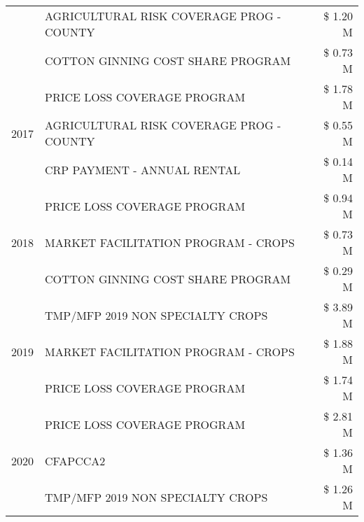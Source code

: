 \begin{tabular}{llr}
 & AGRICULTURAL RISK COVERAGE PROG - COUNTY & \$ 1.20 M \\
 & COTTON GINNING COST SHARE PROGRAM & \$ 0.73 M \\
\cline{1-3}
\multirow[t]{3}{*}{2017} & PRICE LOSS COVERAGE PROGRAM & \$ 1.78 M \\
 & AGRICULTURAL RISK COVERAGE PROG - COUNTY & \$ 0.55 M \\
 & CRP PAYMENT - ANNUAL RENTAL & \$ 0.14 M \\
\cline{1-3}
\multirow[t]{3}{*}{2018} & PRICE LOSS COVERAGE PROGRAM & \$ 0.94 M \\
 & MARKET FACILITATION PROGRAM - CROPS & \$ 0.73 M \\
 & COTTON GINNING COST SHARE PROGRAM & \$ 0.29 M \\
\cline{1-3}
\multirow[t]{3}{*}{2019} & TMP/MFP 2019 NON SPECIALTY CROPS & \$ 3.89 M \\
 & MARKET FACILITATION PROGRAM - CROPS & \$ 1.88 M \\
 & PRICE LOSS COVERAGE PROGRAM & \$ 1.74 M \\
\cline{1-3}
\multirow[t]{3}{*}{2020} & PRICE LOSS COVERAGE PROGRAM & \$ 2.81 M \\
 & CFAPCCA2 & \$ 1.36 M \\
 & TMP/MFP 2019 NON SPECIALTY CROPS & \$ 1.26 M \\
\cline{1-3}
\bottomrule
\end{tabular}
